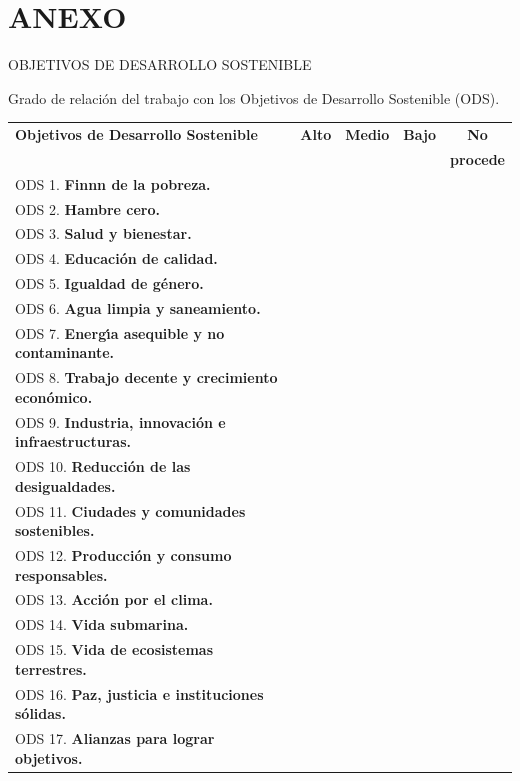 \documentclass[11pt]{article}
\begin{document}
\phantom{x}

\vspace{1ex}

\section*{ANEXO}

\vspace{2ex}

OBJETIVOS DE DESARROLLO SOSTENIBLE

\vspace{4ex}

Grado de relaci\'on del trabajo con los Objetivos de Desarrollo Sostenible (ODS).

\vspace{2ex}

\begin{tabular}{|l|c|c|c|c|}\hline
\textbf{Objetivos de Desarrollo Sostenible} & \textbf{Alto} & \textbf{Medio} & \textbf{Bajo} & \textbf{No} \\
& & & & \textbf{procede} \\ \hline
ODS 1.  \textbf{Finnn de la pobreza.}                            & & & & \\ \hline
ODS 2.  \textbf{Hambre cero.}                                  & & & & \\ \hline
ODS 3.  \textbf{Salud y bienestar.}                            & & & & \\ \hline
ODS 4.  \textbf{Educaci\'on de calidad.}                       & & & & \\ \hline
ODS 5.  \textbf{Igualdad de g\'enero.}                         & & & & \\ \hline
ODS 6.  \textbf{Agua limpia y saneamiento.}                    & & & & \\ \hline
ODS 7.  \textbf{Energ\'{\i}a asequible y no contaminante.}     & & & & \\ \hline
ODS 8.  \textbf{Trabajo decente y crecimiento econ\'omico.}    & & & & \\ \hline
ODS 9.  \textbf{Industria, innovaci\'on e infraestructuras.}   & & & & \\ \hline
ODS 10. \textbf{Reducci\'on de las desigualdades.}             & & & & \\ \hline
ODS 11. \textbf{Ciudades y comunidades sostenibles.}           & & & & \\ \hline
ODS 12. \textbf{Producci\'on y consumo responsables.}          & & & & \\ \hline
ODS 13. \textbf{Acci\'on por el clima.}                        & & & & \\ \hline
ODS 14. \textbf{Vida submarina.}                               & & & & \\ \hline
ODS 15. \textbf{Vida de ecosistemas terrestres.}               & & & & \\ \hline
ODS 16. \textbf{Paz, justicia e instituciones s\'olidas.}      & & & & \\ \hline
ODS 17. \textbf{Alianzas para lograr objetivos.}               & & & & \\ \hline
\end{tabular}
\end{document}
